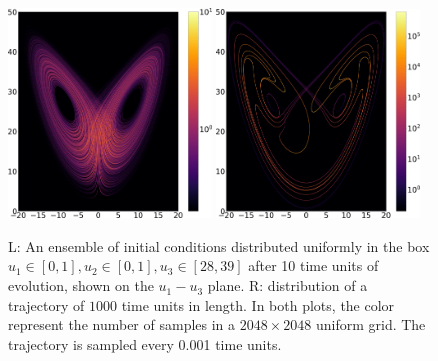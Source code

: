 \begin{figure} \centering
\includegraphics[width=0.48\textwidth]{lorenz_trajectory_1000.0.png}
\hspace{0.02\textwidth}
\includegraphics[width=0.48\textwidth]{lorenz_ensemble_10.png}
\caption{
L: An ensemble of initial conditions distributed uniformly in the box $u_1\in[0,1], u_2\in[0,1], u_3\in[28,39]$ 
after 10 time units of evolution, shown on the $u_1-u_3$ plane.
R: distribution of a trajectory of $1000$ time units in length.
In both plots, the color represent the number of samples in a
$2048\times2048$ uniform grid.  The trajectory is sampled every 0.001 time units.
}
\label{fig:lorenz_ergodicity1}
\end{figure}
